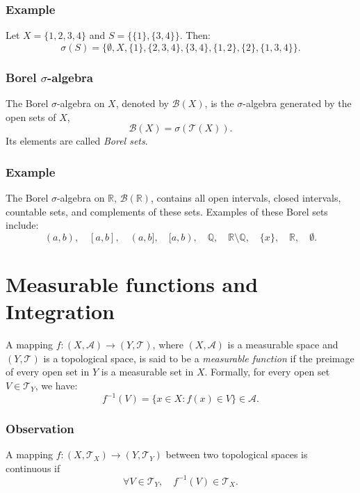\documentclass[11pt]{article}
\begin{document}
\subsubsection*{Example}
Let $X = \{1, 2, 3, 4\}$ and $S = \{\{1\}, \{3, 4\}\}$. Then:
\[\sigma(S) = \{\emptyset, X, \{1\}, \{2, 3, 4\}, \{3, 4\}, \{1, 2\}, \{2\}, \{1, 3, 4\}\}.\]

\subsubsection{Borel $\sigma$-algebra}
The Borel $\sigma$-algebra on $X$, denoted by $\mathcal{B}(X)$, is the $\sigma$-algebra generated by the open sets of $X$, 
\[\mathcal{B}(X) = \sigma(\mathcal{T}(X)).\]
Its elements are called \textit{Borel sets}.

\subsubsection*{Example}
The Borel $\sigma$-algebra on $\mathbb{R}$, $\mathcal{B}(\mathbb{R})$, contains all open intervals, closed intervals, countable sets, and complements of these sets. Examples of these Borel sets include:
\[(a, b), \quad [a, b], \quad (a, b], \quad [a, b), \quad \mathbb{Q}, \quad \mathbb{R} \setminus \mathbb{Q}, \quad \{x\}, \quad \mathbb{R}, \quad \emptyset.\]

\section{Measurable functions and Integration}
A mapping $f: (X, \mathcal{A}) \to (Y, \mathcal{T})$, where $(X, \mathcal{A})$ is a measurable space and $(Y, \mathcal{T})$ is a topological space, is said to be a \textit{measurable function} if the preimage of every open set in $Y$ is a measurable set in $X$. Formally, for every open set $V \in \mathcal{T}_Y$, we have:
\[f^{-1}(V) = \{x \in X : f(x) \in V\} \in \mathcal{A}.\]

\subsubsection*{Observation}
A mapping $f: (X, \mathcal{T}_X) \to (Y, \mathcal{T}_Y)$ between two topological spaces is continuous if 
\[ \forall V \in \mathcal{T}_Y, \quad f^{-1}(V) \in \mathcal{T}_X.\]
\end{document}
